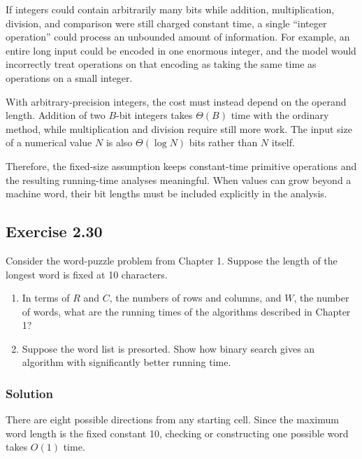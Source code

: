 \documentclass[12pt,a4paper]{article}
\begin{document}
If integers could contain arbitrarily many bits while addition,
multiplication, division, and comparison were still charged constant
time, a single ``integer operation'' could process an unbounded amount
of information. For example, an entire long input could be encoded in
one enormous integer, and the model would incorrectly treat operations
on that encoding as taking the same time as operations on a small
integer.

With arbitrary-precision integers, the cost must instead depend on the
operand length. Addition of two $B$-bit integers takes $\Theta(B)$ time
with the ordinary method, while multiplication and division require
still more work. The input size of a numerical value $N$ is also
$\Theta(\log N)$ bits rather than $N$ itself.

Therefore, the fixed-size assumption keeps constant-time primitive
operations and the resulting running-time analyses meaningful. When
values can grow beyond a machine word, their bit lengths must be
included explicitly in the analysis.

\subsection*{\color{sectionnavy}Exercise 2.30}

\noindent
Consider the word-puzzle problem from Chapter 1. Suppose the length of
the longest word is fixed at 10 characters.

\begin{enumerate}
  \renewcommand{\labelenumi}{\alph{enumi}.}
  \item In terms of $R$ and $C$, the numbers of rows and columns, and
  $W$, the number of words, what are the running times of the algorithms
  described in Chapter 1?
  \item Suppose the word list is presorted. Show how binary search gives
  an algorithm with significantly better running time.
\end{enumerate}

\subsubsection*{\color{sectionnavy}Solution}

There are eight possible directions from any starting cell. Since the
maximum word length is the fixed constant 10, checking or constructing
one possible word takes $O(1)$ time.
\end{document}
